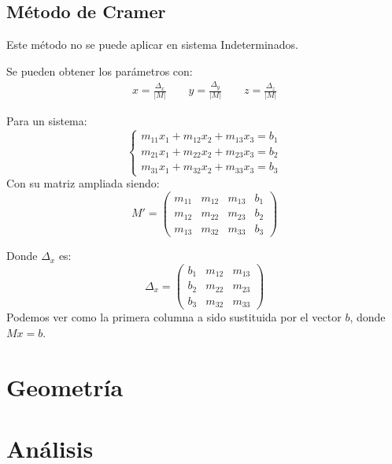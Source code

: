 \documentclass[arial,a4paper,print]{article}
\begin{document}
\subsection{Método de Cramer}
Este método no se puede aplicar en sistema Indeterminados. 

Se pueden obtener los parámetros con:
\begin{align*}
	x = \frac{\Delta_{x}}{|M|} \qquad y = \frac{\Delta_{y}}{|M|} \qquad z = \frac{\Delta_{z}}{|M|} 
\end{align*}
 
Para un sistema:
\begin{equation*}
	\begin{cases}
		m_{11}x_{1} + m_{12}x_{2} + m_{13}x_{3} = b_{1} \\
		m_{21}x_{1} + m_{22}x_{2} + m_{23}x_{3} = b_{2} \\
		m_{31}x_{1} + m_{32}x_{2} + m_{33}x_{3} = b_{3} 
	\end{cases}
\end{equation*}
Con su matriz ampliada siendo:
\begin{equation*}
	M' = \left(\begin{array}{lll|l}
			m_{11} & m_{12} & m_{13} & b_{1}\\
			m_{12} & m_{22} & m_{23} & b_{2}\\
			m_{13} & m_{32} & m_{33} & b_{3}
	\end{array}\right)
\end{equation*}

Donde $\Delta_{x}$ es:
\begin{equation*}
	\Delta_{x} = \begin{pmatrix}
		b_{1} & m_{12} & m_{13} \\
		b_{2} & m_{22} & m_{23} \\
		b_{3} & m_{32} & m_{33} 
	\end{pmatrix}
\end{equation*}
Podemos ver como la primera columna a sido sustituida por el vector $b$, donde $Mx=b$.

\section{Geometría}



\section{Análisis}
\end{document}
